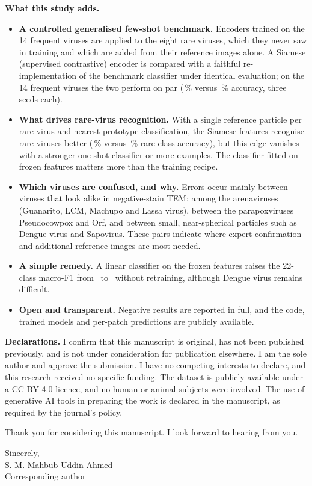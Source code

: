 \documentclass[11pt]{article}
\begin{document}
\textbf{What this study adds.}
\begin{itemize}[leftmargin=1.2em, itemsep=2pt, topsep=0pt]
\item \textbf{A controlled generalised few-shot benchmark.} Encoders trained on the 14 frequent viruses are applied to the eight rare viruses, which they never saw in training and which are added from their reference images alone. A Siamese (supervised contrastive) encoder is compared with a faithful re-implementation of the benchmark classifier under identical evaluation; on the 14 frequent viruses the two perform on par (\SiamClosedAcc\,\% versus \BOneClosedAcc\,\% accuracy, three seeds each).
\item \textbf{What drives rare-virus recognition.} With a single reference particle per rare virus and nearest-prototype classification, the Siamese features recognise rare viruses better (\KshotSiamOne\,\% versus \KshotBOneOne\,\% rare-class accuracy), but this edge vanishes with a stronger one-shot classifier or more examples. The classifier fitted on frozen features matters more than the training recipe.
\item \textbf{Which viruses are confused, and why.} Errors occur mainly between viruses that look alike in negative-stain TEM: among the arenaviruses (Guanarito, LCM, Machupo and Lassa virus), between the parapoxviruses Pseudocowpox and Orf, and between small, near-spherical particles such as Dengue virus and Sapovirus. These pairs indicate where expert confirmation and additional reference images are most needed.
\item \textbf{A simple remedy.} A linear classifier on the frozen features raises the 22-class macro-F1 from \SiamNcmFOne\ to \SiamLrFOne\ without retraining, although Dengue virus remains difficult.
\item \textbf{Open and transparent.} Negative results are reported in full, and the code, trained models and per-patch predictions are publicly available.
\end{itemize}

\textbf{Declarations.} I confirm that this manuscript is original, has not been published previously, and is not under consideration for publication elsewhere. I am the sole author and approve the submission. I have no competing interests to declare, and this research received no specific funding. The dataset is publicly available under a CC BY 4.0 licence, and no human or animal subjects were involved. The use of generative AI tools in preparing the work is declared in the manuscript, as required by the journal's policy.

Thank you for considering this manuscript. I look forward to hearing from you.

Sincerely,\\[18pt]
S. M. Mahbub Uddin Ahmed\\
Corresponding author
\end{document}
